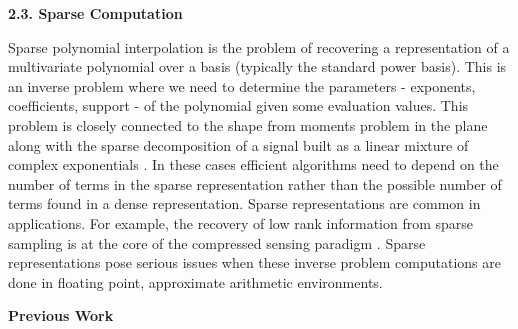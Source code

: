 
\bigskip
\noindent
\textbf{2.3. Sparse Computation}
\bigskip



Sparse polynomial interpolation is the problem of recovering a representation of a multivariate polynomial over a basis (typically the standard power basis).  This is an inverse problem where we need to determine the parameters - exponents, coefficients, support - of the polynomial given some evaluation values.  This problem is closely connected to the shape from moments problem  in the plane \cite{MilanfarGolub} along with the sparse decomposition of a signal built as a linear mixture of complex exponentials \cite{HuaSarkar}. In these cases efficient algorithms need to depend on the number of terms in the sparse representation rather than the possible number of terms found in a dense representation. Sparse representations 
are common in applications. For example, the recovery of low rank information from sparse sampling is at the core of the
compressed sensing paradigm \cite{candes}.  Sparse representations pose serious issues when these inverse problem computations are done in floating point, approximate arithmetic environments. 

\newpage
\bigskip
\noindent
{\bf Previous Work}
\bigskip

